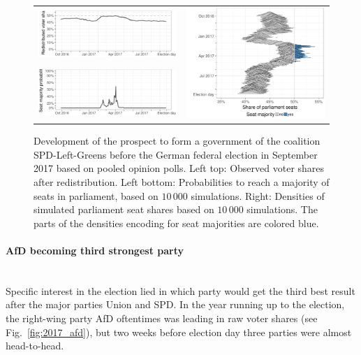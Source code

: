 \documentclass[smallcondensed]{svjour3}     %
\begin{document}
\begin{figure}[H]\centering
\begin{tabular}{ll}
\includegraphics[height=.15\textwidth]{figures/2017_pooled_spdleftgreens_rawSharesRedist.pdf}
&
\multirow{2}{*}[13ex]{\includegraphics[height=30ex]{figures/2017_pooled_spdleftgreens_ridgeline.pdf}}
\\
\includegraphics[height=.15\textwidth]{figures/2017_pooled_spdleftgreens_prob.pdf}
\end{tabular}
\caption{Development of the prospect to form a government of the coalition SPD-Left-Greens before the German federal election in September 2017 based on pooled opinion polls.
Left top: Observed voter shares after redistribution. Left bottom: Probabilities to reach a majority of seats in parliament, based on $10\,000$ simulations. Right: Densities of simulated parliament seat shares based on $10\,000$ simulations. The parts of the densities encoding for seat majorities are colored blue.
\label{fig:2017_spdleftgreens}
}
\end{figure}


\paragraph{AfD becoming third strongest party} \ \\
Specific interest in the election lied in which party would
get the third best result after the major parties Union and SPD.
In the year running up to the election, the right-wing party
AfD oftentimes was leading in raw voter shares (see Fig.~\ref{fig:2017_afd}),
but two weeks before election day three parties were almost
head-to-head.
\end{document}
